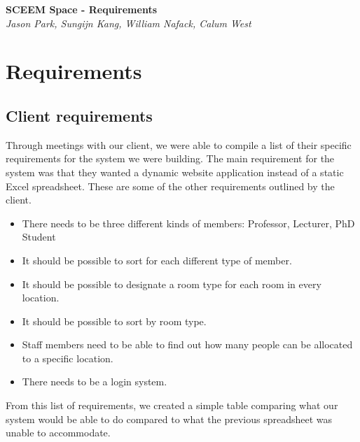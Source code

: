 \documentclass[11pt,a4paper]{article}
\begin{document}
\begin{titlepage}
   \begin{center}
      \Large\textbf{SCEEM Space - Requirements}\\
      \large\textit{Jason Park, Sungijn Kang, William Nafack, Calum West}
   \end{center}
\end{titlepage}

\section{Requirements}
\subsection{Client requirements}
Through meetings with our client, we were able to compile a list of their specific requirements for the system we were building. The main requirement for the system was that they wanted a dynamic website application instead of a static Excel spreadsheet. These are some of the other requirements outlined by the client.

\begin{itemize}
    \item There needs to be three different kinds of members: Professor, Lecturer, PhD Student
    \item It should be possible to sort for each different type of member.
    \item It should be possible to designate a room type for each room in every location.
    \item It should be possible to sort by room type.
    \item Staff members need to be able to find out how many people can be allocated to a specific location.
    \item There needs to be a login system.
\end{itemize}

From this list of requirements, we created a simple table comparing what our system would be able to do compared to what the previous spreadsheet was unable to accommodate.
\end{document}
